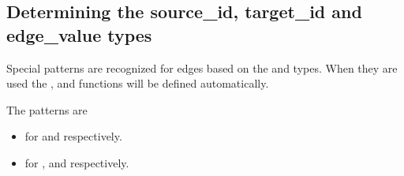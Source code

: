 

\subsection{Determining the source\_id, target\_id and edge\_value types}
Special patterns are recognized for edges based on the  and  types. When they are used the , 
 and  functions will be defined automatically.

The  patterns are
\begin{itemize}
    \item {} for  and  respectively.
    \item {} for ,  and  respectively.
\end{itemize}

